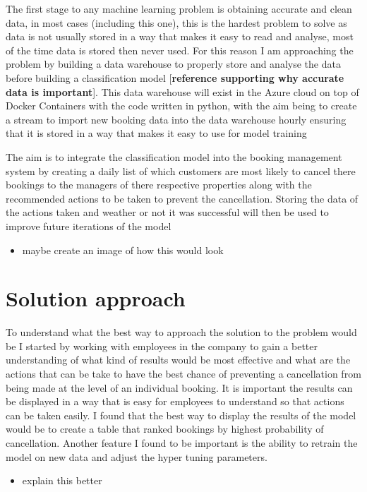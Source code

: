 The first stage to any machine learning problem is obtaining accurate and clean data, in most cases (including this one), this is the hardest problem to solve as data is not usually stored in a way that makes it easy to read and analyse, most of the time data is stored  then never used. For this reason I am approaching the problem by building a data warehouse to properly store and analyse the data before building a classification model [\textbf{reference supporting why accurate data is important}]. This data warehouse will exist in the Azure cloud on top of Docker Containers with the code written in python, with the aim being to create a stream to import new booking data into the data warehouse hourly ensuring that it is stored in a way that makes it easy to use for model training

The aim is to integrate the classification model into the booking management system by creating a daily list of which customers are most likely to cancel there bookings to the managers of there respective properties along with the recommended actions to be taken to prevent the cancellation. Storing the data of the actions taken and weather or not it was successful will then be used to improve future iterations of the model

\begin{itemize}
\item maybe create an image of how this would look
\end{itemize}



\section{Solution approach}

To understand what the best way to approach the solution to the problem would be I started by working with employees in the company to gain a better understanding of what kind of results would be most effective and what are the actions that can be take to have the best chance of preventing a cancellation from being made at the level of an individual booking. It is important the results can be displayed in a way that is easy for employees to understand so that actions can be taken easily. I found that the best way to display the results of the model would be to create a table that ranked bookings by highest probability of cancellation. Another feature I found to be important is the ability to retrain the model on new data and adjust the hyper tuning parameters.
\begin{itemize}
\item explain this better
\end{itemize}

